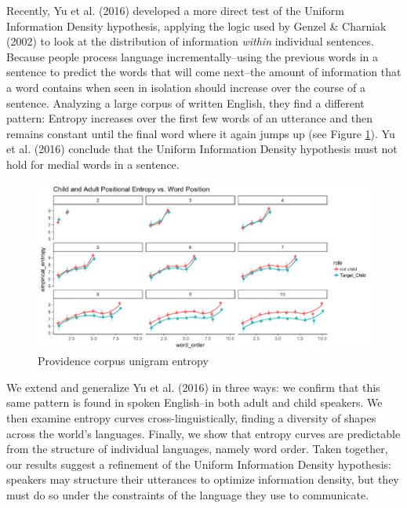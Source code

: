 \documentclass[10pt, letterpaper]{article}
\newenvironment{CodeChunk}{}{}
\begin{document}
Recently, Yu et al. (2016) developed a more direct test of the Uniform
Information Density hypothesis, applying the logic used by Genzel \&
Charniak (2002) to look at the distribution of information \emph{within}
individual sentences. Because people process language
incrementally--using the previous words in a sentence to predict the
words that will come next--the amount of information that a word
contains when seen in isolation should increase over the course of a
sentence. Analyzing a large corpus of written English, they find a
different pattern: Entropy increases over the first few words of an
utterance and then remains constant until the final word where it again
jumps up (see Figure \ref{fig:our_replication}). Yu et al. (2016)
conclude that the Uniform Information Density hypothesis must not hold
for medial words in a sentence.

\begin{CodeChunk}
\begin{figure}[h]

{\centering \includegraphics{figs/our_replication-1} 

}

\caption[Providence corpus unigram entropy]{Providence corpus unigram entropy}\label{fig:our_replication}
\end{figure}
\end{CodeChunk}

We extend and generalize Yu et al. (2016) in three ways: we confirm that
this same pattern is found in spoken English--in both adult and child
speakers. We then examine entropy curves cross-linguistically, finding a
diversity of shapes across the world's languages. Finally, we show that
entropy curves are predictable from the structure of individual
languages, namely word order. Taken together, our results suggest a
refinement of the Uniform Information Density hypothesis: speakers may
structure their utterances to optimize information density, but they
must do so under the constraints of the language they use to
communicate.
\end{document}
